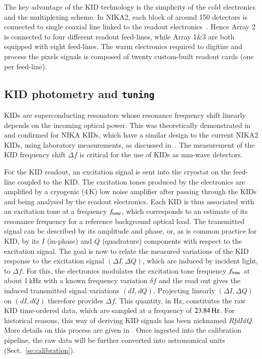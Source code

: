 \documentclass[traditionalabstract]{aa}
\newcommand{\lp}[1]{#1}
\begin{document}
The key advantage of the KID technology is the simplicity of the cold
electronics and the multiplexing scheme. In NIKA2, each block of around 150
detectors is connected to single coaxial line linked to the readout
electronics~\citep{Bourrion2016}. {\lp Hence Array 2 is connected to four
different readout feed-lines, while Array 1$\&$3 are both equipped with eight
feed-lines.}
The warm electronics required to digitize
and process the pixels signals is composed of twenty custom-built readout
cards (one per feed-line).

\subsection{KID photometry and {\tt tuning}}
\label{se:tuning}

KIDs are superconducting resonators whose resonance
frequency shift linearly depends on the incoming optical power.
{\lp This was theoretically demonstrated in~\citet{Swenson2010} and
confirmed for NIKA KIDs, which have a similar design to the current
NIKA2 KIDs, using laboratory measurements, as discussed
in~\citet{Monfardini2014JLTP}.}
The measurement of the KID frequency shift $\Delta f$ is critical for the use of
KIDs as mm-wave detectors. 

For the KID readout, an excitation signal is sent into the cryostat on the
feed-line coupled to the KID.
The excitation tones produced by the electronics are amplified by a
cryogenic (4\,K) low noise amplifier after passing through the KIDs and
being analysed by the readout electronics. {\lp Each KID is thus
associated with an excitation tone at a frequency $f_{\rm{tone}}$, which
corresponds to an estimate of its resonance frequency for a reference
background optical load.}
The transmitted signal can be described by its
amplitude and phase, or, as is common practice for KID, by its $I$
(in-phase) and $Q$ (quadrature) components
with respect to the excitation signal.
The goal is now to relate the measured variations of the KID response
to the excitation signal $(\Delta I, \Delta Q)$, which are induced by incident light, to
$\Delta f$. For this, the electronics modulates the excitation tone
frequency $f_{\rm{tone}}$ at about 1\,kHz with a known frequency variation $\delta f$
and the read out gives the induced transmitted signal variations
$(dI, dQ)$. Projecting linearly $(\Delta I, \Delta Q)$ on $(dI, dQ)$ therefore
provides $\Delta f$. This quantity, in Hz, constitutes the raw KID
time-ordered data, which are sampled at a frequency of
$23.84\,\rm{Hz}$. For historical reasons, this way of deriving KID
signals has been nicknamed \emph{RfdIdQ}. More details on this process
are given in \citet{Calvo2013}.
Once ingested into the calibration pipeline, the raw data will be further converted
into astronomical units (Sect.~\ref{se:calibration}).\\
\end{document}

